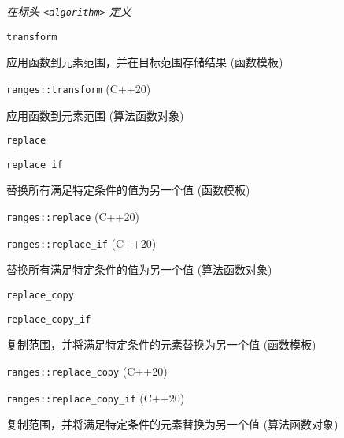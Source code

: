 \textit{在标头 \lstinline{<algorithm>} 定义}

\noindent \lstinline{transform}

应⽤函数到元素范围，并在⽬标范围存储结果 (函数模板)

\noindent \lstinline{ranges::transform} (C++20)

应⽤函数到元素范围 (算法函数对象)

\noindent \lstinline{replace}

\noindent \lstinline{replace_if}

替换所有满⾜特定条件的值为另⼀个值 (函数模板)

\noindent \lstinline{ranges::replace} (C++20)

\noindent \lstinline{ranges::replace_if} (C++20)

替换所有满⾜特定条件的值为另⼀个值 (算法函数对象)

\noindent \lstinline{replace_copy}

\noindent \lstinline{replace_copy_if}

复制范围，并将满⾜特定条件的元素替换为另⼀个值 (函数模板)

\noindent \lstinline{ranges::replace_copy} (C++20)

\noindent \lstinline{ranges::replace_copy_if} (C++20)

复制范围，并将满⾜特定条件的元素替换为另⼀个值 (算法函数对象)